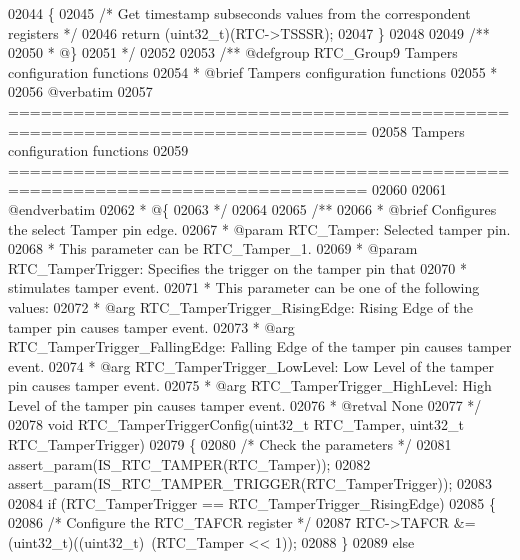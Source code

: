 \begin{DoxyCode}
02044 \{
02045   \textcolor{comment}{/* Get timestamp subseconds values from the correspondent registers */}
02046   \textcolor{keywordflow}{return} (uint32\_t)(RTC->TSSSR);
02047 \}
02048 
02049 \textcolor{comment}{/**}
02050 \textcolor{comment}{  * @\}}
02051 \textcolor{comment}{  */}
02052 
02053 \textcolor{comment}{/** @defgroup RTC\_Group9 Tampers configuration functions}
02054 \textcolor{comment}{ *  @brief   Tampers configuration functions }
02055 \textcolor{comment}{ *}
02056 \textcolor{comment}{@verbatim   }
02057 \textcolor{comment}{ ===============================================================================}
02058 \textcolor{comment}{                       Tampers configuration functions}
02059 \textcolor{comment}{ ===============================================================================  }
02060 \textcolor{comment}{}
02061 \textcolor{comment}{@endverbatim}
02062 \textcolor{comment}{  * @\{}
02063 \textcolor{comment}{  */}
02064 
02065 \textcolor{comment}{/**}
02066 \textcolor{comment}{  * @brief  Configures the select Tamper pin edge.}
02067 \textcolor{comment}{  * @param  RTC\_Tamper: Selected tamper pin.}
02068 \textcolor{comment}{  *          This parameter can be RTC\_Tamper\_1.}
02069 \textcolor{comment}{  * @param  RTC\_TamperTrigger: Specifies the trigger on the tamper pin that }
02070 \textcolor{comment}{  *         stimulates tamper event. }
02071 \textcolor{comment}{  *   This parameter can be one of the following values:}
02072 \textcolor{comment}{  *     @arg RTC\_TamperTrigger\_RisingEdge: Rising Edge of the tamper pin causes tamper event.}
02073 \textcolor{comment}{  *     @arg RTC\_TamperTrigger\_FallingEdge: Falling Edge of the tamper pin causes tamper event.}
02074 \textcolor{comment}{  *     @arg RTC\_TamperTrigger\_LowLevel: Low Level of the tamper pin causes tamper event.}
02075 \textcolor{comment}{  *     @arg RTC\_TamperTrigger\_HighLevel: High Level of the tamper pin causes tamper event.}
02076 \textcolor{comment}{  * @retval None}
02077 \textcolor{comment}{  */}
02078 \textcolor{keywordtype}{void} RTC_TamperTriggerConfig(uint32\_t RTC\_Tamper, uint32\_t RTC\_TamperTrigger)
02079 \{
02080   \textcolor{comment}{/* Check the parameters */}
02081   assert_param(IS\_RTC\_TAMPER(RTC\_Tamper));
02082   assert_param(IS\_RTC\_TAMPER\_TRIGGER(RTC\_TamperTrigger));
02083 
02084   \textcolor{keywordflow}{if} (RTC\_TamperTrigger == RTC_TamperTrigger_RisingEdge)
02085   \{
02086     \textcolor{comment}{/* Configure the RTC\_TAFCR register */}
02087     RTC->TAFCR &= (uint32\_t)((uint32\_t)~(RTC\_Tamper << 1));
02088   \}
02089   \textcolor{keywordflow}{else}

\end{DoxyCode}
